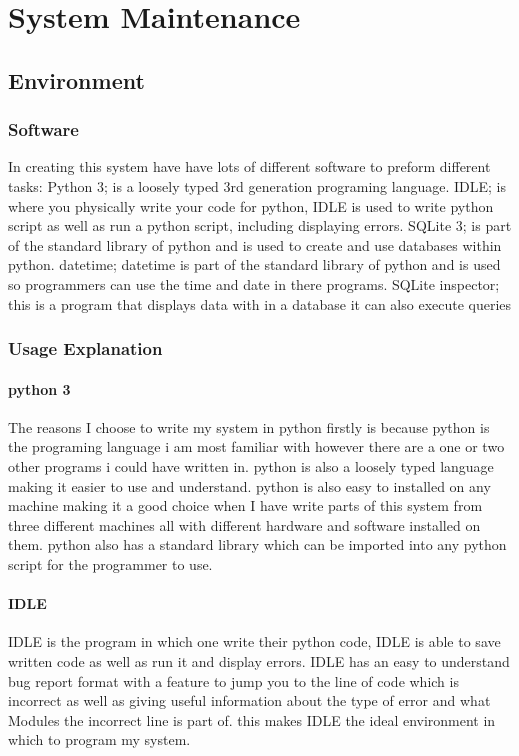 \chapter{System Maintenance}

\section{Environment}

\subsection{Software}
In creating this system have have lots of different software to preform different tasks: Python 3; is a loosely typed 3rd generation programing language. IDLE; is where you physically write your code for python, IDLE is used to write python script as well as run a python script, including displaying errors. SQLite 3; is part of the standard library of python and is used to create and use databases within python. datetime; datetime is part of the standard library of python and is used so programmers can use the time and date in there programs. SQLite inspector; this is a program that displays data with in a database it can also execute queries

\subsection{Usage Explanation}

\subsubsection{python 3}
The reasons I choose to write my system in python firstly is because python is the programing language i am most familiar with however there are a one or two other programs i could have written in. python is also a loosely typed language making it easier to use and understand. python is also easy to installed on any machine making it a good choice when I have write parts of this system from three different machines all with different hardware and software installed on them. python also has a standard library which can be imported into any python script for the programmer to use.

\subsubsection{IDLE}
IDLE is the program in which one write their python code, IDLE is able to save written code as well as run it and display errors. IDLE has an easy to understand bug report format with a feature to jump you to the line of code which is incorrect as well as giving useful information about the type of error and what Modules the incorrect line is part of. this makes IDLE the ideal environment in which to program my system. 

